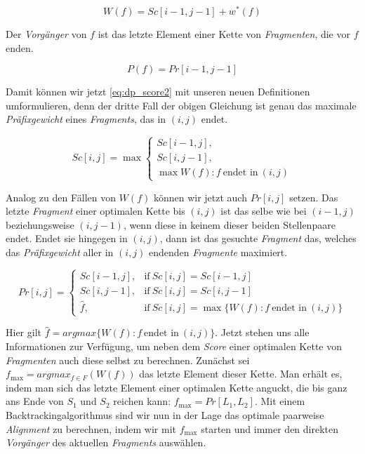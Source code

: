 \begin{equation}\label{eq:praefixgewicht}
	W(f) = Sc[i\!-\!1,j\!-\!1]+w^*(f)
\end{equation}

Der \emph{Vorgänger} von $f$ ist das letzte Element einer Kette von \emph{Fragmenten}, die vor $f$ enden.

\begin{equation}\label{eq:vorgaenger}
	P(f) = Pr[i\!-\!1,j\!-\!1]
\end{equation}

Damit können wir jetzt \eqref{eq:dp_score2} mit unseren neuen Definitionen umformulieren, denn der dritte Fall der obigen Gleichung ist genau das maximale \emph{Präfixgewicht} eines \emph{Fragments}, das in $(i,j)$ endet.

\begin{equation}\label{eq:praefixgewicht2}
	Sc[i,j] = \max
		\begin{cases}
		Sc[i\!-\!1,j], \\
		Sc[i,j\!-\!1], \\
		\max{W(f): f\: \text{endet in}\: (i,j)}
	\end{cases}	
\end{equation}

Analog zu den Fällen von $W(f)$ können wir jetzt auch $Pr[i,j]$ setzen. Das letzte \emph{Fragment} einer optimalen Kette bis $(i,j)$ ist das selbe wie bei $(i-1,j)$ beziehungsweise $(i,j-1)$, wenn diese in keinem dieser beiden Stellenpaare endet. Endet sie hingegen in $(i,j)$, dann ist das gesuchte \emph{Fragment} das, welches das \emph{Präfixgewicht} aller in $(i,j)$ endenden \emph{Fragmente} maximiert.

\begin{equation}\label{eq:vorgaenger2}
	Pr[i,j] =
		\begin{cases}
			Sc[i-1,j], & \text{if}\: Sc[i,j] = Sc[i\!-\!1,j]\\
			Sc[i,j-1], & \text{if}\: Sc[i,j] = Sc[i,j\!-\!1]\\
			\hat{f},   & \text{if}\: Sc[i,j] = \max{\{W(f) : f\: \text{endet in}\: (i,j)\}}
		\end{cases}	
\end{equation}

Hier gilt $\hat{f} = argmax\{W(f) : f\: \text{endet in}\: (i,j) \}$. Jetzt stehen uns alle Informationen zur Verfügung, um neben dem \emph{Score} einer optimalen Kette von \emph{Fragmenten} auch diese selbst zu berechnen. Zunächst sei $f_{\max} = argmax_{f\in F}(W(f))$ das letzte Element dieser Kette. Man erhält es, indem man sich das letzte Element einer optimalen Kette anguckt, die bis ganz ans Ende von $S_1$ und $S_2$ reichen kann: $f_{\max} = Pr[L_1,L_2]$. Mit einem Backtrackingalgorithmus sind wir nun in der Lage das optimale paarweise \emph{Alignment} zu berechnen, indem wir mit $f_{\max}$ starten und immer den direkten \emph{Vorgänger} des aktuellen \emph{Fragments} auswählen.

